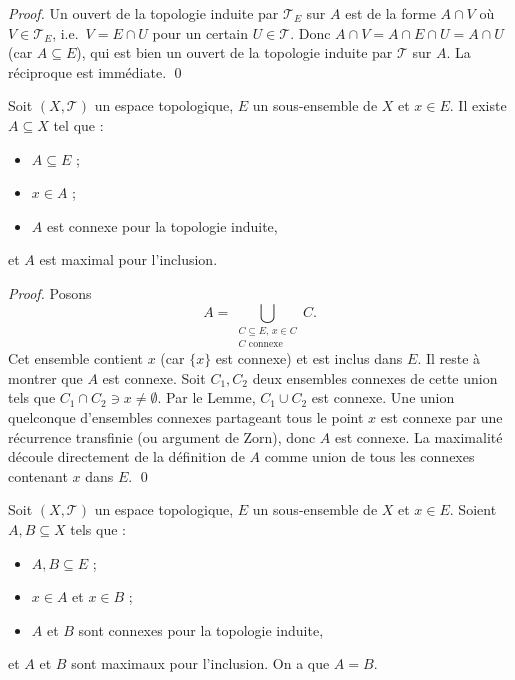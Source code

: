\begin{proof}
Un ouvert de la topologie induite par $\mathcal{T}_E$ sur $A$ est de la forme
$A \cap V$ où $V \in \mathcal{T}_E$, i.e.\ $V = E \cap U$ pour un certain $U \in \mathcal{T}$.
Donc $A \cap V = A \cap E \cap U = A \cap U$ (car $A \subseteq E$), qui est
bien un ouvert de la topologie induite par $\mathcal{T}$ sur $A$. La réciproque est
immédiate. \qed
\end{proof}


\begin{lemme}[Existence]
Soit $(X, \mathcal{T})$ un espace topologique, $E$ un sous-ensemble de $X$ et
$x \in E$. Il existe $A \subseteq X$ tel que :
\begin{itemize}
    \item $A \subseteq E$ ;
    \item $x \in A$ ;
    \item $A$ est connexe pour la topologie induite,
\end{itemize}
et $A$ est maximal pour l'inclusion.
\end{lemme}

\begin{proof}
Posons
\[
    A = \bigcup_{\substack{C \subseteq E,\, x \in C \\ C \text{ connexe}}} C.
\]
Cet ensemble contient $x$ (car $\{x\}$ est connexe) et est inclus dans $E$.
Il reste à montrer que $A$ est connexe. Soit $C_1, C_2$ deux ensembles connexes
de cette union tels que $C_1 \cap C_2 \ni x \neq \emptyset$. Par le Lemme,
$C_1 \cup C_2$ est connexe. Une union quelconque d'ensembles connexes partageant
tous le point $x$ est connexe par une récurrence transfinie (ou argument de Zorn),
donc $A$ est connexe. La maximalité découle directement de la définition de $A$
comme union de tous les connexes contenant $x$ dans $E$. \qed
\end{proof}


\begin{lemme}[Unicité]
Soit $(X, \mathcal{T})$ un espace topologique, $E$ un sous-ensemble de $X$ et
$x \in E$. Soient $A, B \subseteq X$ tels que :
\begin{itemize}
    \item $A, B \subseteq E$ ;
    \item $x \in A$ et $x \in B$ ;
    \item $A$ et $B$ sont connexes pour la topologie induite,
\end{itemize}
et $A$ et $B$ sont maximaux pour l'inclusion. On a que $A = B$.
\end{lemme}

